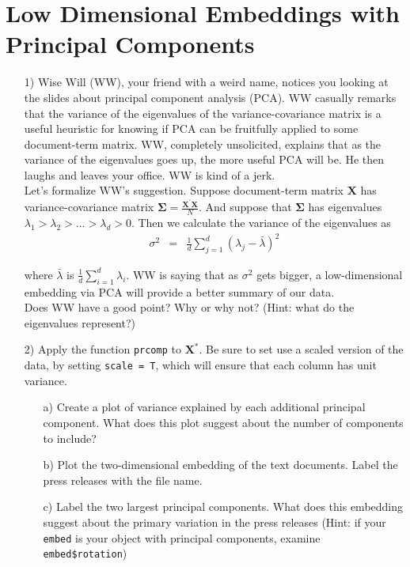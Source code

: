 \documentclass[12pt,letterpaper]{article}
\begin{document}
\section*{Low Dimensional Embeddings with Principal Components}

\begin{itemize}
\item[1)]  Wise Will (WW), your friend with a weird name, notices you looking at the slides about principal component analysis (PCA).   WW casually remarks that the variance of the eigenvalues of the variance-covariance matrix is a useful heuristic for knowing if PCA can be fruitfully applied to some document-term matrix.  WW, completely unsolicited, explains that as the variance of the eigenvalues goes up, the more useful PCA will be.  He then laughs and leaves your office.  WW is kind of a jerk.   \\

Let's formalize WW's suggestion. Suppose document-term matrix $\boldsymbol{X}$ has variance-covariance matrix $\boldsymbol{\Sigma} = \frac{\boldsymbol{X}^{'}\boldsymbol{X}}{N}$.  And suppose that $\boldsymbol{\Sigma}$ has eigenvalues $\lambda_{1}>\lambda_{2}>\hdots > \lambda_{d}>0$. Then we calculate the variance of the eigenvalues as 
\begin{eqnarray}
\sigma^{2} & = & \frac{1}{d} \sum_{j=1}^{d}(\lambda_{j} - \bar{\lambda})^{2} \nonumber 
\end{eqnarray}

where $\bar{\lambda}$ is $\frac{1}{d} \sum_{i=1}^{d} \lambda_{i}$. WW is saying that as $\sigma^{2}$ gets bigger, a low-dimensional embedding via PCA will provide a better summary of our data.   \\

Does WW have a good point?  Why or why not? (Hint: what do the eigenvalues represent?)
\item[2)] Apply the function {\tt prcomp} to $\boldsymbol{X}^{*}$. Be sure to set use a scaled version of the data, by setting {\tt scale = T}, which will ensure that each column has unit variance.  
\begin{itemize}
\item[a)] Create a plot of variance explained by each additional principal component. What does this plot suggest about the number of components to include?
\item[b)] Plot the two-dimensional embedding of the text documents.  Label the press releases with the file name.  
\item[c)] Label the two largest principal components.  What does this embedding suggest about the primary variation in the press releases  (Hint: if your {\tt embed} is your object with principal components, examine {\tt embed\$rotation})
\end{itemize}

\end{itemize}
\end{document}
